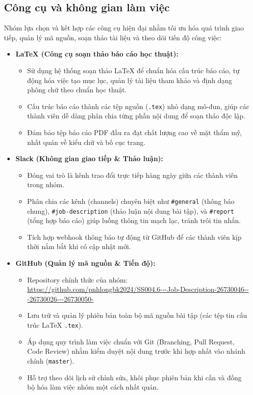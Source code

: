 \subsection{Công cụ và không gian làm việc}

Nhóm lựa chọn và kết hợp các công cụ hiện đại nhằm tối ưu hóa quá trình giao tiếp, quản lý mã nguồn, soạn thảo tài liệu và theo dõi tiến độ công việc:

\begin{itemize}
    \item \textbf{\LaTeX{} (Công cụ soạn thảo báo cáo học thuật):}
    \begin{itemize}
        \item Sử dụng hệ thống soạn thảo \LaTeX{} để chuẩn hóa cấu trúc báo cáo, tự động hóa việc tạo mục lục, quản lý tài liệu tham khảo và định dạng phông chữ theo chuẩn học thuật.
        \item Cấu trúc báo cáo thành các tệp nguồn (\texttt{.tex}) nhỏ dạng mô-đun, giúp các thành viên dễ dàng phân chia từng phần nội dung để soạn thảo độc lập.
        \item Đảm bảo tệp báo cáo PDF đầu ra đạt chất lượng cao về mặt thẩm mỹ, nhất quán về kiểu chữ và bố cục trang.
    \end{itemize}

    \item \textbf{Slack (Không gian giao tiếp \& Thảo luận):}
    \begin{itemize}
        \item Đóng vai trò là kênh trao đổi trực tiếp hàng ngày giữa các thành viên trong nhóm.
        \item Phân chia các kênh (channels) chuyên biệt như \texttt{\#general} (thông báo chung), \texttt{\#job-description} (thảo luận nội dung bài tập), và \texttt{\#report} (tổng hợp báo cáo) giúp luồng thông tin mạch lạc, tránh trôi tin nhắn.
        \item Tích hợp webhook thông báo tự động từ GitHub để các thành viên kịp thời nắm bắt khi có cập nhật mới.
    \end{itemize}
    
    \item \textbf{GitHub (Quản lý mã nguồn \& Tiến độ):}
    \begin{itemize}
        \item Repository chính thức của nhóm: \url{https://github.com/pnhlongbk2024/SS004.6---Job-Description-26730046---26730026---26730050-}
        \item Lưu trữ và quản lý phiên bản toàn bộ mã nguồn bài tập (các tệp tin cấu trúc \LaTeX{} \texttt{.tex}).
        \item Áp dụng quy trình làm việc chuẩn với Git (Branching, Pull Request, Code Review) nhằm kiểm duyệt nội dung trước khi hợp nhất vào nhánh chính (\texttt{master}).
        \item Hỗ trợ theo dõi lịch sử chỉnh sửa, khôi phục phiên bản khi cần và đồng bộ hóa làm việc nhóm một cách nhất quán.
    \end{itemize}
\end{itemize}
